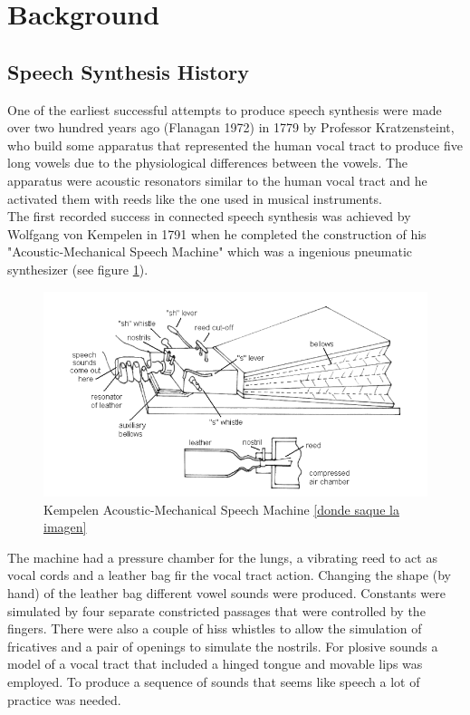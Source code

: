 \section{Background}\label{background}
\subsection{Speech Synthesis History}\label{ssh}
One of the earliest successful attempts to produce speech synthesis were made over two hundred years ago (Flanagan 1972) in 1779 by Professor Kratzensteint, who build some apparatus that represented the human vocal tract to produce five long vowels due to the physiological differences between the vowels. The apparatus were acoustic resonators similar to the human vocal tract and he activated them with reeds like the one used in musical instruments.\\
The first recorded success in connected speech synthesis was achieved by  Wolfgang von Kempelen in 1791 when he completed the construction of his "Acoustic-Mechanical Speech Machine" which was a ingenious pneumatic synthesizer (see figure \ref{kempelen}).
\begin{figure}[!htb]
	\begin{center}
	\includegraphics[width=1\textwidth]{img/kempelen.png}
	\end{center}
	\caption{\label{kempelen}Kempelen Acoustic-Mechanical Speech Machine \ref{donde saque la imagen}}
\end{figure}
The machine had a pressure chamber for the lungs, a vibrating reed to act as vocal cords and a leather bag fir the vocal tract action. Changing the shape (by hand) of the leather bag different vowel sounds were produced. Constants were simulated by four separate constricted passages that were controlled by the fingers. There were also a couple of hiss whistles to allow the simulation of fricatives and a pair of openings to simulate the nostrils. For plosive sounds a model of a vocal tract that included a hinged tongue and movable lips was employed. To produce a sequence of sounds that seems like speech a lot of practice was needed.\\
